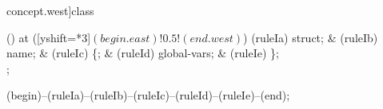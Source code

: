 \begin{syntax}[[xshift=22mm]concept.west]{class}
  
  \node[sequence,anchor=north] () at ([yshift=\syntaxrulenodeheight-0.8pt*3]$(begin.east)!0.5!(end.west)$) {
    \node[terminal] (ruleIa) {struct};
    &
    \node[terminal]    (ruleIb) {name};
    &
    \node[terminal]    (ruleIc) {\{};
    &
    \node[nonterminal] (ruleId) {global-vars};
    &
    \node[terminal]    (ruleIe) {\}};
    \\
  };
  
  \draw[path] (begin)--(ruleIa)--(ruleIb)--(ruleIc)--(ruleId)--(ruleIe)--(end);
\end{syntax}
